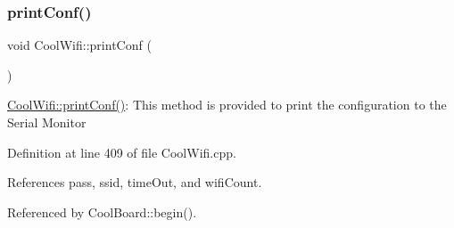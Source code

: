 \subsubsection{\texorpdfstring{print\+Conf()}{printConf()}}
{\footnotesize\ttfamily void Cool\+Wifi\+::print\+Conf (\begin{DoxyParamCaption}{ }\end{DoxyParamCaption})}

\hyperlink{classCoolWifi_a9e6105c6d13d35ec510f6633da9e0223}{Cool\+Wifi\+::print\+Conf()}\+: This method is provided to print the configuration to the Serial Monitor 

Definition at line 409 of file Cool\+Wifi.\+cpp.



References pass, ssid, time\+Out, and wifi\+Count.



Referenced by Cool\+Board\+::begin().


